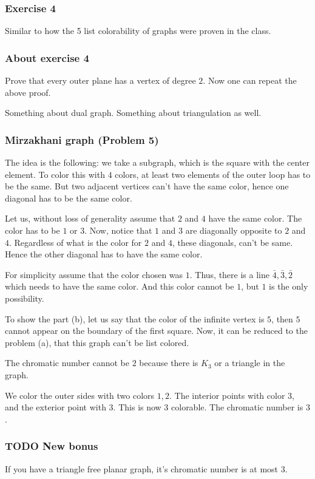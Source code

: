 \documentclass[11pt]{article}
\begin{document}
\subsubsection{Exercise 4}
\label{sec:orgcc985c1}
Similar to how the 5 list colorability of graphs were proven in the class.
\subsubsection{About exercise 4}
\label{sec:orgdfe372b}
Prove that every outer plane has a vertex of degree \(2\). Now one can repeat
the above proof.

Something about dual graph. Something about triangulation as well.
\subsubsection{Mirzakhani graph (Problem 5)}
\label{sec:org6631828}
The idea is the following: we take a subgraph, which is the square with the
center element. To color this with \(4\) colors, at least two elements of the
outer loop has to be the same. But two adjacent vertices can't have the same
color, hence one diagonal has to be the same color.

Let us, without loss of generality assume that \(2\) and \(4\) have the same
color. The color has to be \(1\) or \(3\). Now, notice that \(1\) and \(3\) are
diagonally opposite to \(2\) and \(4\). Regardless of what is the color for \(2\)
and \(4\), these diagonals, can't be same. Hence the other diagonal has to
have the same color.

For simplicity assume that the color chosen was \(1\). Thus, there is a line
\(\bar{4}, \bar{3}, \bar{2}\) which needs to have the same color. And this
color cannot be \(1\), but \(1\) is the only possibility.

To show the part (b), let us say that the color of the infinite vertex is
\(5\), then \(5\) cannot appear on the boundary of the first square. Now, it can
be reduced to the problem (a), that this graph can't be list colored.

The chromatic number cannot be \(2\) because there is \(K_3\) or a triangle in
the graph.

We color the outer sides with two colors \(1, 2\). The interior points with
color \(3\), and the exterior point with \(3\). This is now \(3\) colorable. The
chromatic number is \(3\).
\subsubsection{{\bfseries\sffamily TODO} New bonus}
\label{sec:orgbf0f583}
If you have a triangle free planar graph, it's chromatic number is at most \(3\).
\end{document}
